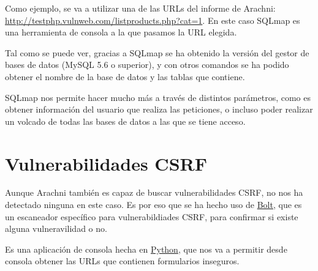 \documentclass{\ClassPath/viu-tfm-template}
\begin{document}
Como ejemplo, se va a utilizar una de las URLs del informe de Arachni: \href{http://testphp.vulnweb.com/listproducts.php?cat=1}{http://testphp.vulnweb.com/listproducts.php?cat=1}. En este caso SQLmap es una herramienta de consola a la que pasamos la URL elegida.


Tal como se puede ver, gracias a SQLmap se ha obtenido la versión del gestor de bases de datos (MySQL 5.6 o superior), y con otros comandos se ha podido obtener el nombre de la base de datos y las tablas que contiene.

SQLmap nos permite hacer mucho más a través de distintos parámetros, como es obtener información del usuario que realiza las peticiones, o incluso poder realizar un volcado de todas las bases de datos a las que se tiene acceso.


\chapter{Vulnerabilidades CSRF}
Aunque Arachni también es capaz de buscar vulnerabilidades CSRF, no nos ha detectado ninguna en este caso. Es por eso que se ha hecho uso de \href{https://github.com/s0md3v/Bolt}{Bolt}, que es un escaneador específico para vulnerabildiades CSRF, para confirmar si existe alguna vulneravilidad o no.

Es una aplicación de consola hecha en \href{https://www.python.org/}{Python}, que nos va a permitir desde consola obtener las URLs que contienen formularios inseguros.
\end{document}
